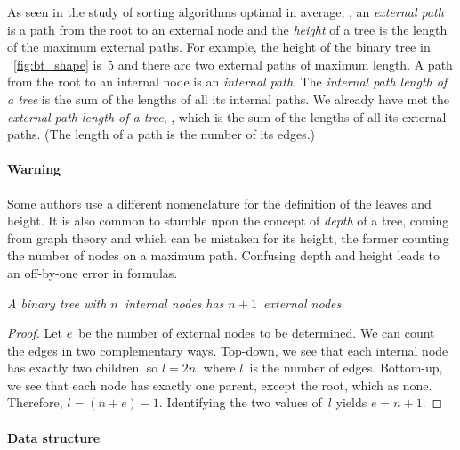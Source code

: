 As seen in the study of sorting algorithms optimal in average,
, an \emph{external path} is a path from the root to an external
node and the
\emph{height} of a tree is the length of the
maximum external paths. For example, the height of the binary tree in
\fig~\vref{fig:bt_shape} is~\(5\) and there are two external paths of
maximum length. A path from the root to an internal node is an
\emph{internal path}. The \emph{internal
  path length of a tree} is the sum
of the lengths of all its internal paths. We already have met the
\emph{external path length of a tree}, , which is the sum of the
lengths of all its external paths. (The length of a path is the number
of its edges.)

\paragraph{Warning}

Some authors use a different nomenclature for the definition of the
leaves and height. It is also common to stumble upon the concept of
\emph{depth} of a tree, coming from graph
theory and which can be mistaken for its height, the former counting
the number of nodes on a maximum path. Confusing depth and height
leads to an off\hyp{}by\hyp{}one error in formulas.

\begin{thm}
\label{thm:int_ext}
\textsl{A binary tree with \(n\)~internal nodes has \(n+1\)~external
  nodes.}
\end{thm}
\begin{proof}
Let \(e\)~be the number of external nodes to be determined. We can
count the edges in two complementary ways. Top\hyp{}down, we see that
each internal node has exactly two children, so \(l=2n\), where
\(l\)~is the number of edges. Bottom\hyp{}up, we see that each node
has exactly one parent, except the root, which as none. Therefore,
\(l=(n+e)-1\). Identifying the two values of~\(l\) yields \(e=n+1\).
\end{proof}

\paragraph{Data structure}

